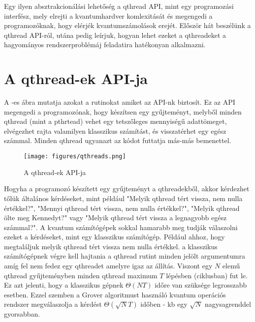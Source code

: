 \indent Egy ilyen absztrakcionálási lehetőség a qthread API, mint egy programozási interfész, mely elrejti a kvantumhardver komlexitását és megengedi a programozóknak, hogy elérjék kvantumszámolások erejét.
Először hát beszélünk a qthread API-ról, utána pedig leírjuk, hogyan lehet ezeket a qthreadeket a hagyományos rendszerproblémáj feladatira hatékonyan alkalmazni.

\section{A qthread-ek API-ja}
A -es ábra mutatja azokat a rutinokat amiket az API-nk biztosít.
Ez az API megengedi a programozónak, hogy készítsen egy gyűjteményt, melyből minden qthread (mint a pthrtead) vehet egy tetszőleges mennyiségű adattömeget, elvégezhet rajta valamilyen klasszikus számítást, és visszatérhet egy egész számmal.
Minden qthread ugyanazt az kódot futtatja más-más bemenettel.

\begin{figure}[!ht]
\centering
\texttt{[image: figures/qthreads.png]}
\caption{A qthread-ek API-ja}
\label{fig:qthreads}
\end{figure}


\indent Hogyha a programozó készített egy gyűjteményt a qthreadekből, akkor kérdezhet tőlük általános kérdéseket, mint például "Melyik qthread tért vissza, nem nulla értékkel?", "Mennyi qthread tért vissza, nem nulla értékkel?", "Melyik qthread ölte meg Kennedyt?" vagy "Melyik qthread tért vissza a legnagyobb egész számmal?".
\indent A kvantum számítógépek sokkal hamarabb meg tudják válaszolni ezeket a kérdéseket, mint egy klasszikus számítógép.
Például ahhoz, hogy megtaláljuk melyik qthread tért vissza nem nulla értékkel. a klasszikus számítógépnek végre kell hajtania a qthread rutint minden jelölt argumentumra amíg fel nem fedez egy qthreadet amelyre igaz az állítás.
Viszont egy $N$ elemű qthread gyűjteményben minden qthread maximum $T$ lépésben (ciklusban) fut le.
Ez azt jelenti, hogy a klasszikus gépnek $\Theta(NT)$ időre van szüksége legrosszabb esetben. Ezzel szemben a Grover algoritmust használó kvantum operációs rendszer megválaszolja a kérdést $\Theta(\sqrt{N}T)$ időben - kb egy $\sqrt{N}$ nagysagrenddel gyorsabban.

